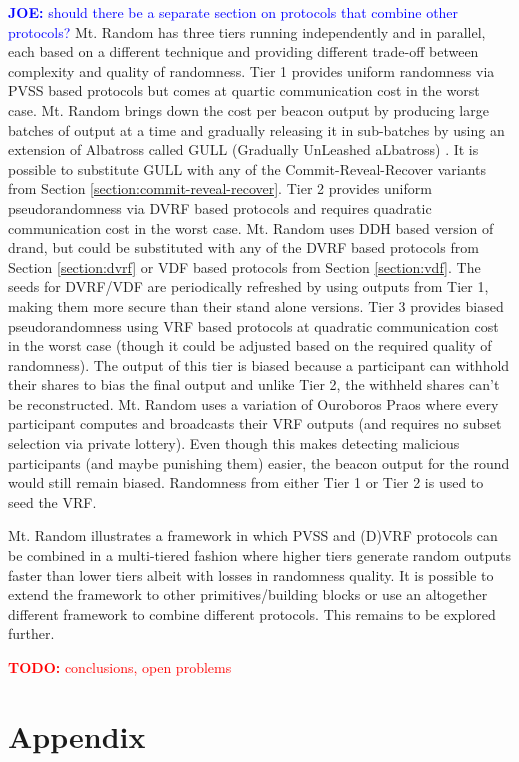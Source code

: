 \documentclass[letterpaper,twocolumn,10pt]{article}
\theoremstyle{definition}
\theoremstyle{remark}
\newcommand{\todo}[1]{\textcolor{red}{\textbf{TODO:} #1}}
\newcommand{\joenote}[1]{\textcolor{blue}{\textbf{JOE:} #1}}
\begin{document}
\joenote{should there be a separate section on protocols that combine other protocols?}
Mt. Random has three tiers running independently and in parallel, each based on a different technique and providing different trade-off between complexity and quality of randomness. Tier 1 provides uniform randomness via PVSS based protocols but comes at quartic communication cost in the worst case. Mt. Random  brings down the cost per beacon output by producing large batches of output at a time and gradually releasing it in sub-batches by using an extension of Albatross called GULL (Gradually UnLeashed aLbatross) \cite{cascudomt}. It is possible to substitute GULL with any of the Commit-Reveal-Recover variants from Section \ref{section:commit-reveal-recover}. Tier 2 provides uniform pseudorandomness via DVRF based protocols and requires quadratic communication cost in the worst case. Mt. Random uses DDH based version of drand, but could be substituted with any of the DVRF based protocols from Section \ref{section:dvrf} or VDF based protocols from Section \ref{section:vdf}. The seeds for DVRF/VDF are periodically refreshed by using outputs from Tier 1, making them more secure than their stand alone versions. Tier 3 provides biased pseudorandomness using VRF based protocols at quadratic communication cost in the worst case (though it could be adjusted based on the required quality of randomness). The output of this tier is biased because a participant can withhold their shares to bias the final output and unlike Tier 2, the withheld shares can't be reconstructed. Mt. Random uses a variation of Ouroboros Praos where every participant computes and broadcasts their VRF outputs (and requires no subset selection via private lottery). Even though this makes detecting malicious participants (and maybe punishing them) easier, the beacon output for the round would still remain biased. Randomness from either Tier 1 or Tier 2 is used to seed the VRF. 

Mt. Random illustrates a framework in which PVSS and (D)VRF protocols can be combined in a multi-tiered fashion where higher tiers generate random outputs faster than lower tiers albeit with losses in randomness quality. It is possible to extend the framework to other primitives/building blocks or use an altogether different framework to combine different protocols. This remains to be explored further.

\todo{conclusions, open problems}

\printbibliography
\appendix
\section*{Appendix}
\renewcommand{\thesection}{\arabic{section}}
\end{document}
